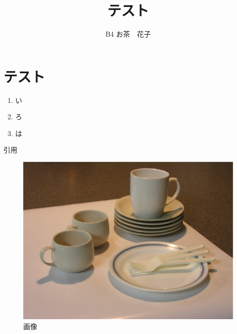 \documentclass[lualatex,a4paper]{bxjsarticle}
\title{\bf テスト}
\author{B4 お茶　花子}
\begin{document}
\twocolumn{
	\maketitle
}

\section{テスト}

\begin{enumerate}
	\item い
	\item ろ
	\item は
\end{enumerate}

引用\cite{test-bib}

\begin{figure}
	\begin{center}
		\includegraphics[width=\linewidth]{cups.png}
	\end{center}
	\caption{画像}
	\label{fig:cups}
\end{figure}


\small
\end{document}
